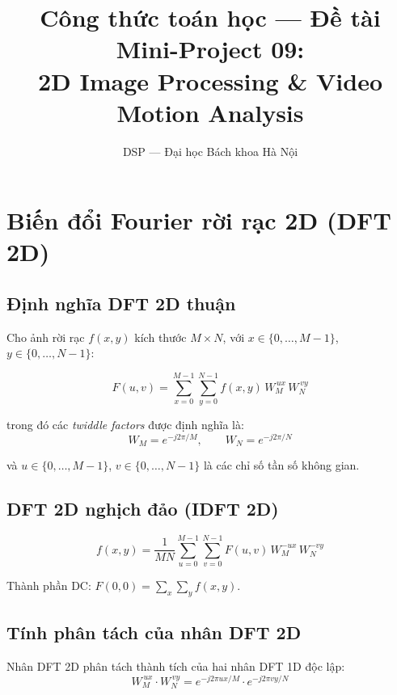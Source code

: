 \documentclass[12pt, a4paper]{article}
\title{Công thức toán học --- Đề tài Mini-Project 09:\\
2D Image Processing \& Video Motion Analysis}
\author{DSP --- Đại học Bách khoa Hà Nội}
\date{}
\begin{document}
\maketitle
\tableofcontents
\newpage

\section{Biến đổi Fourier rời rạc 2D (DFT 2D)}

\subsection{Định nghĩa DFT 2D thuận}

Cho ảnh rời rạc $f(x,y)$ kích thước $M \times N$, với $x \in \{0,\ldots,M-1\}$,
$y \in \{0,\ldots,N-1\}$:

\begin{equation}
  F(u,v) = \sum_{x=0}^{M-1} \sum_{y=0}^{N-1}
            f(x,y)\, W_M^{\,ux}\, W_N^{\,vy}
  \label{eq:dft2d}
\end{equation}

trong đó các \emph{twiddle factors} được định nghĩa là:
\begin{equation}
  W_M = e^{-j2\pi/M}, \qquad W_N = e^{-j2\pi/N}
  \label{eq:twiddle}
\end{equation}

và $u \in \{0,\ldots,M-1\}$, $v \in \{0,\ldots,N-1\}$ là các chỉ số
tần số không gian.

\subsection{DFT 2D nghịch đảo (IDFT 2D)}

\begin{equation}
  f(x,y) = \frac{1}{MN}
            \sum_{u=0}^{M-1} \sum_{v=0}^{N-1}
            F(u,v)\, W_M^{-ux}\, W_N^{-vy}
  \label{eq:idft2d}
\end{equation}

Thành phần DC: $F(0,0) = \displaystyle\sum_x \sum_y f(x,y)$.

\subsection{Tính phân tách của nhân DFT 2D}

Nhân DFT 2D phân tách thành tích của hai nhân DFT 1D độc lập:
\begin{equation}
  W_M^{\,ux} \cdot W_N^{\,vy} = e^{-j2\pi ux/M} \cdot e^{-j2\pi vy/N}
  \label{eq:sep}
\end{equation}
\end{document}
